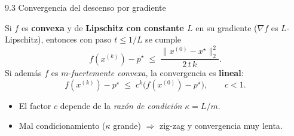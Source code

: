 \documentclass[10pt,aspectratio=169]{beamer}
\begin{document}
\begin{frame}{9.3 Convergencia del descenso por gradiente}
  \begin{theorem}
    Si $f$ es \textbf{convexa} y de \textbf{Lipschitz con constante $L$} en su gradiente
    ($\nabla f$ es $L$-Lipschitz), entonces con paso $t \le 1/L$ se cumple
    \[
      f(x^{(k)}) - p^{\star} \;\le\; \frac{\|x^{(0)} - x^{\star}\|_{2}^{2}}{2\, t\, k}.
    \]
    Si además $f$ es $m$-\emph{fuertemente convexa}, la convergencia es \textbf{lineal}:
    \[
      f(x^{(k)}) - p^{\star} \;\le\; c^{k}\bigl(f(x^{(0)}) - p^{\star}\bigr),
      \qquad c < 1.
    \]
  \end{theorem}
  \begin{itemize}
    \item El factor $c$ depende de la \emph{razón de condición} $\kappa = L/m$.
    \item Mal condicionamiento ($\kappa$ grande) $\Rightarrow$ zig-zag y convergencia muy lenta.
  \end{itemize}
\end{frame}

\end{document}

